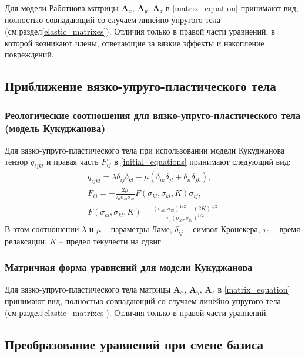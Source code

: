 Для модели Работнова матрицы $\mathbf{A}_x$, $\mathbf{A}_y$, $\mathbf{A}_z$ в \ref{matrix_equation} принимают вид, полностью совпадающий со случаем линейно упругого тела (см.раздел\ref{elastic_matrixes}). Отличия только в правой части уравнений, в которой возникают члены, отвечающие за вязкие эффекты и накопление повреждений.

\clearpage
\newpage

\subsection{Приближение вязко-упруго-пластического тела}

\subsubsection{Реологические соотношения для вязко-упруго-пластического тела (модель Кукуджанова)}

Для вязко-упруго-пластического тела при использовании модели Кукуджанова тензор $q_{ijkl}$ и правая часть $F_{ij}$ в \ref{initial_equations} принимают следующий вид:
\begin{eqnarray}
\label{tensor_qijkl_kukudzhanov}
q_{ijkl}=\lambda\delta_{ij}\delta_{kl}+\mu(\delta_{ik}\delta_{jl}+\delta_{il}
\delta_{jk}),\nonumber\\
F_{ij}=-\frac{2\mu}{\tau_0\sigma_{kl}\sigma_{kl}} F(\sigma_{kl},\sigma_{kl},K)\sigma_{ij},\nonumber\\
F(\sigma_{kl},\sigma_{kl},K) = \frac{(\sigma_{kl},\sigma_{kl})^{1/2}-(2K)^{1/2}}{\tau_0(\sigma_{kl},\sigma_{kl})^{1/2}}
\end{eqnarray}
В этом соотношении $\lambda$ и $\mu$ -- параметры Ламе, $\delta_{ij}$ -- символ Кронекера, $\tau_0$ -- время релаксации, $K$ -- предел текучести на сдвиг.

\subsubsection{Матричная форма уравнений для модели Кукуджанова}
\label{kukudzhanov_matrixes}

Для вязко-упруго-пластического тела матрицы $\mathbf{A}_x$, $\mathbf{A}_y$, $\mathbf{A}_z$ в \ref{matrix_equation} принимают вид, полностью совпадающий со случаем линейно упругого тела (см.раздел\ref{elastic_matrixes}). Отличия только в правой части уравнений.


\clearpage
\newpage

\subsection{Преобразование уравнений при смене базиса}

